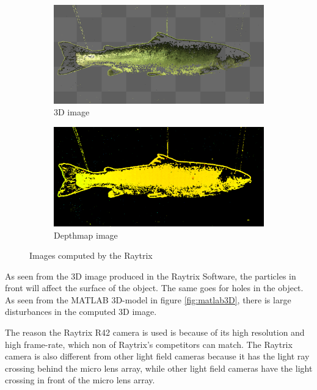 \begin{figure}[h]
    \medskip
    \begin{subfigure}{0.49\textwidth}
        \includegraphics[width=\linewidth]{images/hardware/raytrix_3D_image}
        \caption{3D image} 
        \label{fig:3d_image}
    \end{subfigure}\hspace*{\fill}
    \begin{subfigure}{0.49\textwidth}
        \includegraphics[width=\linewidth]{images/hardware/raytrix_depthmap_image}
        \caption{Depthmap image} 
        \label{fig:depthmap}
    \end{subfigure}
    \caption{Images computed by the Raytrix} 
    \label{fig:raytrix_captures}
\end{figure}

As seen from the 3D image produced in the Raytrix Software, the particles in front will affect the surface of the object. The same goes for holes in the object. As seen from the MATLAB 3D-model in figure \ref{fig:matlab3D}, there is large disturbances in the computed 3D image.

The reason the Raytrix R42 camera is used is because of its high resolution and high frame-rate, which non of Raytrix's competitors can match. The Raytrix camera is also different from other light field cameras because it has the light ray crossing behind the micro lens array, while other light field cameras have the light crossing in front of the micro lens array.\cite{article:stereo_vs_plenoptic}

